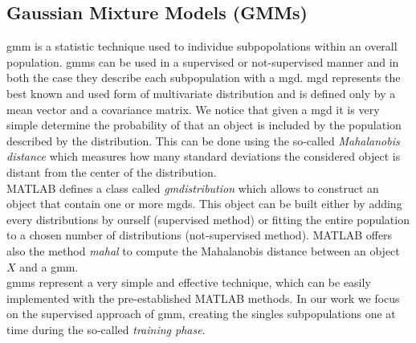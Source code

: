 \subsection{Gaussian Mixture Models (GMMs)}
\label{subsec:gmm}

\gls{gmm} is a statistic technique used to individue subpopolations within an overall population. \gls{gmm}s can be used in a supervised or not-supervised manner and in both the case they describe each subpopulation with a \gls{mgd}.  \gls{mgd} represents the best known and used form of multivariate distribution and is defined only by a mean vector and a covariance matrix. We notice that given a \gls{mgd} it is very simple determine the probability of that an object is included by the population described by the distribution. This can be done using the so-called \textit{Mahalanobis distance} which measures how many standard deviations the considered object is distant from the center of the distribution. \\
%
MATLAB defines a class called \textit{gmdistribution} which allows to construct an object that contain one or more \gls{mgd}s. This object can be built either by adding every distributions by ourself (supervised method) or fitting the entire population to a chosen number of distributions (not-supervised method). MATLAB offers also the method \textit{mahal} to compute the Mahalanobis distance between an object $X$ and a \gls{gmm}. \\
%
\gls{gmm}s represent a very simple and effective technique, which can be easily implemented with the pre-established MATLAB methods. In our work we focus on the supervised approach of \gls{gmm}, creating the singles subpopulations one at time during the so-called \textit{training phase}. 
